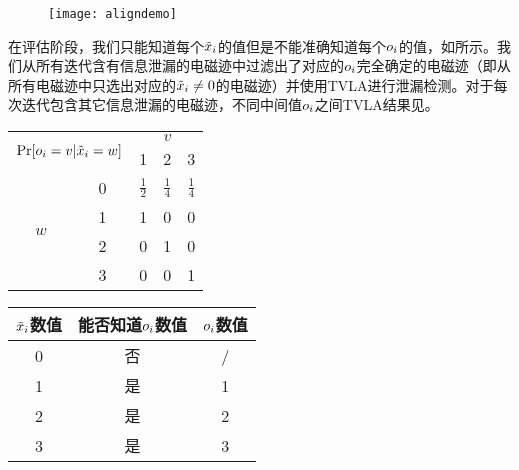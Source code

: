 {	\begin{figure}[!h]
		\begin{center}
			\texttt{[image: aligndemo]}
			\label{fig:aligndemo}
		\end{center}
	\end{figure}

	在评估阶段，我们只能知道每个$\tilde {x}_i$的值但是不能准确知道每个$o_i$的值，如所示。我们从所有迭代含有信息泄漏的电磁迹中过滤出了对应的$o_i$完全确定的电磁迹（即从所有电磁迹中只选出对应的$\tilde {x}_i\neq0$的电磁迹）并使用TVLA进行泄漏检测。对于每次迭代包含其它信息泄漏的电磁迹，不同中间值$o_i$之间TVLA结果见。
	
	\begin{table}[!htb]
		\label{tab:partialknownti}
		\centering
		\begin{subtable}{\twof\textwidth}
			\centering
			\begin{tabular}{cc|ccc}
				\hline
				\multicolumn{2}{c|}{\multirow{2}{*}{$\Pr[o_i=v|\tilde {x}_i=w]$}} & \multicolumn{3}{c}{$v$} \\
				\multicolumn{2}{c|}{}& 1 & 2 & 3 \\
				\hline
				\multirow{4}{*}{$w$} & 0 & $\frac12$ & $\frac14$ & $\frac14$ \\
				& 1 & 1 & 0 & 0 \\
				& 2 & 0 & 1 & 0 \\
				& 3 & 0 & 0 & 1 \\
				\hline
			\end{tabular}
			\label{tab:partialknowntidetail}
		\end{subtable}\hfill
		\begin{subtable}{\twof\textwidth}
			\centering
			\begin{tabular}{c|cc}
				\hline
				$\tilde {x}_i$数值&能否知道$o_i$数值&$o_i$数值\\
				\hline
				0 & 否 & /\\
				1 & 是 & 1\\
				2 & 是 & 2\\
				3 & 是 & 3\\
				\hline
			\end{tabular}
			\label{tab:partialknownticonclusion}
		\end{subtable}
	\end{table}

}
